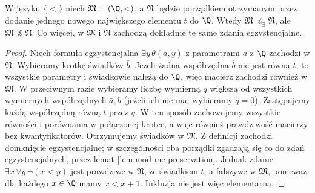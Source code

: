 \begin{przyklad}
\label{ex:mod-mc-ec-not-elementary}
W języku $\{<\}$ niech
$\mathfrak M=(\Q,<)$, a $\mathfrak N$ będzie porządkiem
otrzymanym przez dodanie jednego nowego największego
elementu $t$ do $\Q$.
Wtedy $\mathfrak M\preccurlyeq_{\exists}\mathfrak N$,
ale $\mathfrak M\not\preccurlyeq\mathfrak N$.
Co więcej, w $\mathfrak M$ i $\mathfrak N$ zachodzą
dokładnie te same zdania egzystencjalne.
\end{przyklad}
\begin{proof}
Niech formuła egzystencjalna
$\exists\bar y\,\theta(\bar a,\bar y)$ z parametrami
$\bar a$ z $\Q$ zachodzi w $\mathfrak N$.
Wybieramy krotkę świadków $\bar b$.
Jeżeli żadna współrzędna $\bar b$ nie jest równa $t$,
to wszystkie parametry i świadkowie należą do $\Q$,
więc macierz zachodzi również w $\mathfrak M$.
W przeciwnym razie wybieramy liczbę wymierną $q$
większą od wszystkich wymiernych współrzędnych
$\bar a,\bar b$ (jeżeli ich nie ma, wybieramy $q=0$).
Zastępujemy każdą współrzędną równą $t$ przez $q$.
W ten sposób zachowujemy wszystkie równości
i porównania w połączonej krotce, a więc również
prawdziwość macierzy bez kwantyfikatorów.
Otrzymujemy świadków w $\mathfrak M$.
Z definicji zachodzi domknięcie egzystencjalne;
w szczególności oba porządki zgadzają się co do
zdań egzystencjalnych, przez lemat
\ref{lem:mod-mc-preservation}.
Jednak zdanie
$\exists x\,\forall y\,\neg(x<y)$
jest prawdziwe w $\mathfrak N$, ze świadkiem $t$,
a fałszywe w $\mathfrak M$, ponieważ dla każdego
$x\in\Q$ mamy $x<x+1$.
Inkluzja nie jest więc elementarna.
\end{proof}

